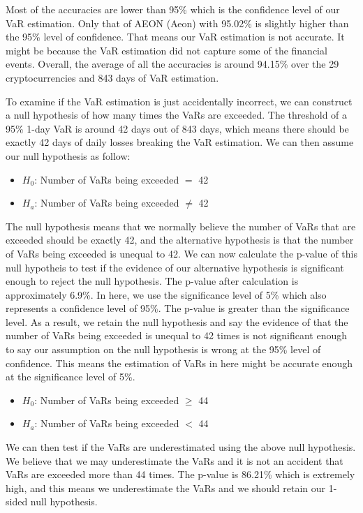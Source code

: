 \documentclass[11pt]{article} %
\theoremstyle{plain}
\theoremstyle{definition}
\begin{document}
Most of the accuracies are lower than 95\% which is the confidence level of our VaR estimation. Only that of AEON (Aeon) with 95.02\% is slightly higher than the 95\% level of confidence. That means our VaR estimation is not accurate. It might be because the VaR estimation did not capture some of the financial events. Overall, the average of all the accuracies is around 94.15\% over the 29 cryptocurrencies and 843 days of VaR estimation.

To examine if the VaR estimation is just accidentally incorrect, we can construct a null hypothesis of how many times the VaRs are exceeded. The threshold of a 95\% 1-day VaR is around 42 days out of 843 days, which means there should be exactly 42 days of daily losses breaking the VaR estimation. We can then assume our null hypothesis as follow:

\begin{itemize}
    \item \textsl{$H_0$}: Number of VaRs being exceeded $=$ 42
    \item \textsl{$H_a$}: Number of VaRs being exceeded $\neq$ 42
\end{itemize}

The null hypothesis means that we normally believe the number of VaRs that are exceeded should be exactly 42, and the alternative hypothesis is that the number of VaRs being exceeded is unequal to 42. We can now calculate the p-value of this null hypotheis to test if the evidence of our alternative hypothesis is significant enough to reject the null hypothesis. The p-value after calculation is approximately 6.9\%. In here, we use the significance level of 5\% which also represents a confidence level of 95\%. The p-value is greater than the significance level. As a result, we retain the null hypothesis and say the evidence of that the number of VaRs being exceeded is unequal to 42 times is not significant enough to say our assumption on the null hypothesis is wrong at the 95\% level of confidence. This means the estimation of VaRs in here might be accurate enough at the significance level of 5\%.

\begin{itemize}
    \item \textsl{$H_0$}: Number of VaRs being exceeded $\geq$ 44
    \item \textsl{$H_a$}: Number of VaRs being exceeded $<$ 44
\end{itemize}

We can then test if the VaRs are underestimated using the above null hypothesis. We believe that we may underestimate the VaRs and it is not an accident that VaRs are exceeded more than 44 times. The p-value is 86.21\% which is extremely high, and this means we underestimate the VaRs and we should retain our 1-sided null hypothesis.
\end{document}
